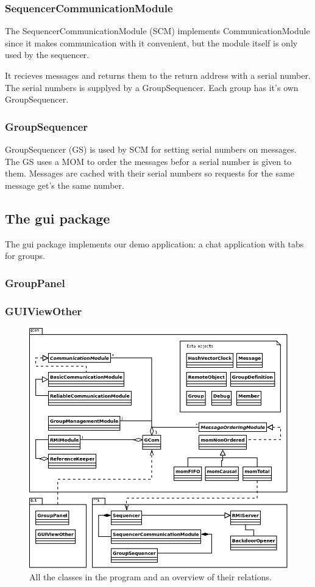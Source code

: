 \documentclass[english]{article}
\begin{document}
\subsubsection{SequencerCommunicationModule}
The SequencerCommunicationModule (SCM) implements CommunicationModule since it makes communication with it convenient, but the module itself is only used by the sequencer. 

It recieves messages and returns them to the return address with a serial number. The serial numbers is supplyed by a GroupSequencer. Each group has it's own GroupSequencer.

\subsubsection{GroupSequencer}
GroupSequencer (GS) is used by SCM for setting serial numbers on messages. The GS uses a MOM to order the messages befor a serial number is given to them. Messages are cached with their serial numbers so requests for the same message get's the same number. 


\subsection{The gui package}
The gui package implements our demo application: a chat application with tabs for groups. 

\subsubsection{GroupPanel}

\subsubsection{GUIViewOther}


\begin{figure}
\includegraphics[width=\textwidth]{superuml.png}
\caption{All the classes in the program and an overview of their relations.}
\label{fig:overview}
\end{figure}
\end{document}
